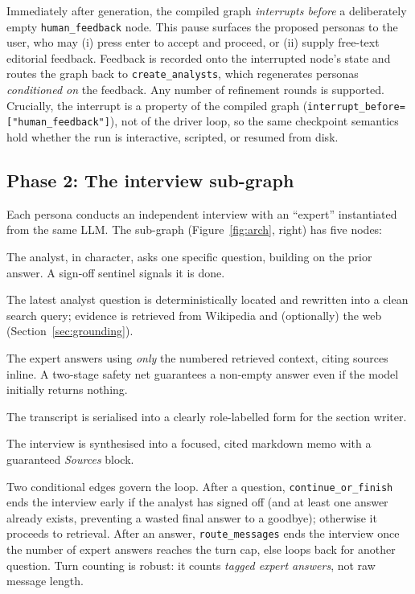 \documentclass[10pt,twocolumn]{article}
\newcommand{\code}[1]{\texttt{\small #1}}
\begin{document}
Immediately after generation, the compiled graph \emph{interrupts before} a
deliberately empty \code{human\_feedback} node. This pause surfaces the proposed
personas to the user, who may (i) press enter to accept and proceed, or (ii)
supply free-text editorial feedback. Feedback is recorded onto the interrupted
node's state and routes the graph back to \code{create\_analysts}, which
regenerates personas \emph{conditioned on} the feedback. Any number of refinement
rounds is supported. Crucially, the interrupt is a property of the compiled graph
(\code{interrupt\_before=["human\_feedback"]}), not of the driver loop, so the
same checkpoint semantics hold whether the run is interactive, scripted, or
resumed from disk.

\subsection{Phase 2: The interview sub-graph}
\label{sec:phase2}
Each persona conducts an independent interview with an ``expert'' instantiated
from the same LLM. The sub-graph (Figure~\ref{fig:arch}, right) has five nodes:

\begin{description}[leftmargin=1em,itemsep=1pt]
  \item[\code{ask\_question}] The analyst, in character, asks one specific
  question, building on the prior answer. A sign-off sentinel signals it is done.
  \item[\code{search\_context}] The latest analyst question is deterministically
  located and rewritten into a clean search query; evidence is retrieved from
  Wikipedia and (optionally) the web (Section~\ref{sec:grounding}).
  \item[\code{answer\_question}] The expert answers using \emph{only} the numbered
  retrieved context, citing sources inline. A two-stage safety net guarantees a
  non-empty answer even if the model initially returns nothing.
  \item[\code{save\_interview}] The transcript is serialised into a clearly
  role-labelled form for the section writer.
  \item[\code{write\_section}] The interview is synthesised into a focused,
  cited markdown memo with a guaranteed \emph{Sources} block.
\end{description}

Two conditional edges govern the loop. After a question,
\code{continue\_or\_finish} ends the interview early if the analyst has signed off
(and at least one answer already exists, preventing a wasted final answer to a
goodbye); otherwise it proceeds to retrieval. After an answer,
\code{route\_messages} ends the interview once the number of expert answers
reaches the turn cap, else loops back for another question. Turn counting is
robust: it counts \emph{tagged expert answers}, not raw message length.
\end{document}
